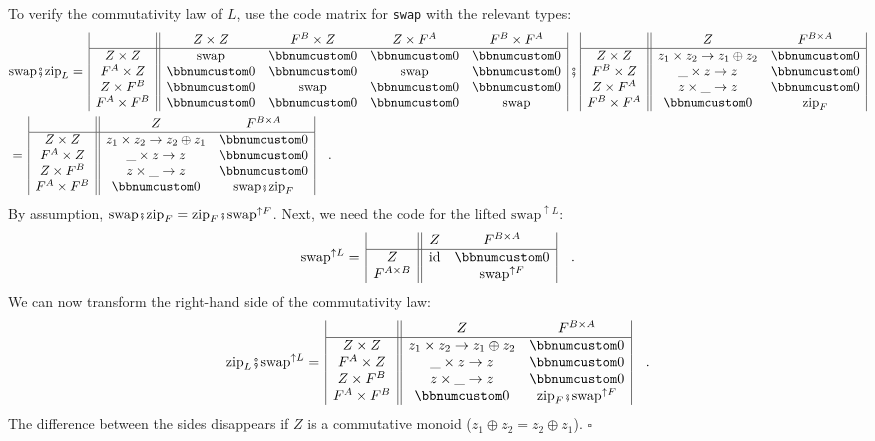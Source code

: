 To verify the commutativity law of $L$, use the code matrix for \lstinline!swap!
with the relevant types:
\begin{align*}
 & \text{swap}\bef\text{zip}_{L}=\,\begin{array}{|c||cccc|}
 & Z\times Z & F^{B}\times Z & Z\times F^{A} & F^{B}\times F^{A}\\
\hline Z\times Z & \text{swap} & \bbnum 0 & \bbnum 0 & \bbnum 0\\
F^{A}\times Z & \bbnum 0 & \bbnum 0 & \text{swap} & \bbnum 0\\
Z\times F^{B} & \bbnum 0 & \text{swap} & \bbnum 0 & \bbnum 0\\
F^{A}\times F^{B} & \bbnum 0 & \bbnum 0 & \bbnum 0 & \text{swap}
\end{array}\,\bef\,\begin{array}{|c||cc|}
 & Z & F^{B\times A}\\
\hline Z\times Z & z_{1}\times z_{2}\rightarrow z_{1}\oplus z_{2} & \bbnum 0\\
F^{B}\times Z & \_\times z\rightarrow z & \bbnum 0\\
Z\times F^{A} & z\times\_\rightarrow z & \bbnum 0\\
F^{B}\times F^{A} & \bbnum 0 & \text{zip}_{F}
\end{array}\\
 & =\,\begin{array}{|c||cc|}
 & Z & F^{B\times A}\\
\hline Z\times Z & z_{1}\times z_{2}\rightarrow z_{2}\oplus z_{1} & \bbnum 0\\
F^{A}\times Z & \_\times z\rightarrow z & \bbnum 0\\
Z\times F^{B} & z\times\_\rightarrow z & \bbnum 0\\
F^{A}\times F^{B} & \bbnum 0 & \text{swap}\bef\text{zip}_{F}
\end{array}\quad.
\end{align*}
By assumption, $\text{swap}\bef\text{zip}_{F}=\text{zip}_{F}\bef\text{swap}^{\uparrow F}$.
Next, we need the code for the lifted $\text{swap}^{\uparrow L}$:
\[
\text{swap}^{\uparrow L}=\,\begin{array}{|c||cc|}
 & Z & F^{B\times A}\\
\hline Z & \text{id} & \bbnum 0\\
F^{A\times B} &  & \text{swap}^{\uparrow F}
\end{array}\quad.
\]
We can now transform the right-hand side of the commutativity law:
\[
\text{zip}_{L}\bef\text{swap}^{\uparrow L}=\,\begin{array}{|c||cc|}
 & Z & F^{B\times A}\\
\hline Z\times Z & z_{1}\times z_{2}\rightarrow z_{1}\oplus z_{2} & \bbnum 0\\
F^{A}\times Z & \_\times z\rightarrow z & \bbnum 0\\
Z\times F^{B} & z\times\_\rightarrow z & \bbnum 0\\
F^{A}\times F^{B} & \bbnum 0 & \text{zip}_{F}\bef\text{swap}^{\uparrow F}
\end{array}\quad.
\]
The difference between the sides disappears if $Z$ is a commutative
monoid ($z_{1}\oplus z_{2}=z_{2}\oplus z_{1}$). $\square$

